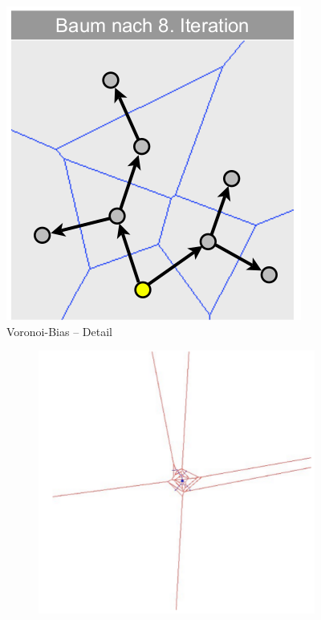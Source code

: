 \begin{figure}[h!]
	\centering
	\includegraphics[width=.3\textwidth]{figures/ch04_voronoi.png}
	\caption{Voronoi-Bias -- Detail}
	\label{fig:vb}
\end{figure}
\begin{figure}[h!]
	\centering
	\begin{subfigure}{.3\textwidth}
		\includegraphics[width=\textwidth]{figures/ch04_voron1.png}
	\end{subfigure}
	\begin{subfigure}{.3\textwidth}

\end{subfigure}
\end{figure}
